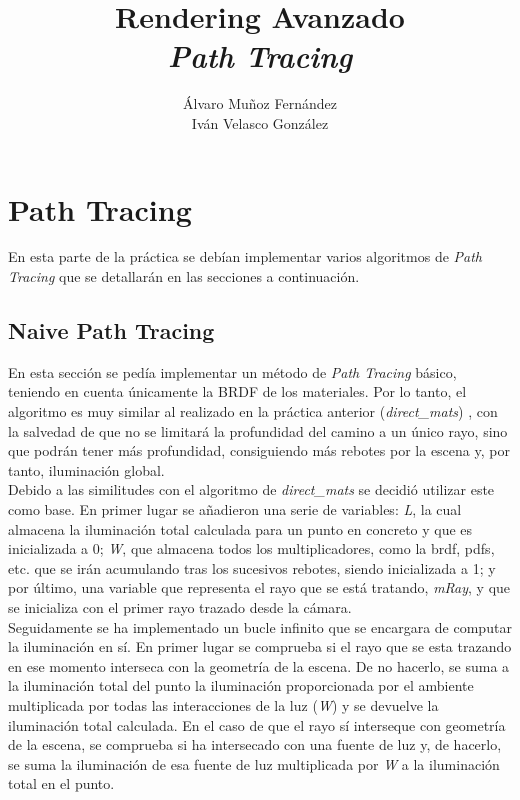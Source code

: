 \documentclass[10pt,oneside,a4paper]{article}
\begin{document}
\begin{titlepage}

\title{\Huge Rendering Avanzado  \\[0.7in] \LARGE \textit{Path Tracing}\\[3.6in]}
\date{}
\author{Álvaro Muñoz Fernández\\
Iván Velasco González}
\maketitle
\thispagestyle{empty}
\end{titlepage}

\section{Path Tracing}
En esta parte de la práctica se debían implementar varios algoritmos de \textit{Path Tracing} que se detallarán en las secciones a continuación.
\subsection{Naive Path Tracing}
En esta sección se pedía implementar un método de \textit{Path Tracing} básico, teniendo en cuenta únicamente la BRDF de los materiales. Por lo tanto, el algoritmo es muy similar al realizado en la práctica anterior (\textit{direct\_mats}) , con la salvedad de que no se limitará la profundidad del camino a un único rayo, sino que podrán tener más profundidad, consiguiendo más rebotes por la escena y, por tanto, iluminación global.\\

Debido a las similitudes con el algoritmo de \textit{direct\_mats} se decidió utilizar este como base. En primer lugar se añadieron una serie de variables: \textit{L}, la cual almacena la iluminación total calculada para un punto en concreto y que es inicializada a 0; \textit{W}, que almacena todos los multiplicadores, como la brdf, pdfs, etc. que se irán acumulando tras los sucesivos rebotes, siendo inicializada a 1; y por último, una variable que representa el rayo que se está tratando, \textit{mRay}, y que se inicializa con el primer rayo trazado desde la cámara.\\

Seguidamente se ha implementado un bucle infinito que se encargara de computar la iluminación en sí. En primer lugar se comprueba si el rayo que se esta trazando en ese momento interseca con la geometría de la escena. De no hacerlo, se suma a la iluminación total del punto la iluminación proporcionada por el ambiente multiplicada por todas las interacciones de la luz (\textit{W}) y se devuelve la iluminación total calculada. En el caso de que el rayo sí interseque con geometría de la escena, se comprueba si ha intersecado con una fuente de luz y, de hacerlo, se suma la iluminación de esa fuente de luz multiplicada por \textit{W} a la iluminación total en el punto.
\end{document}
